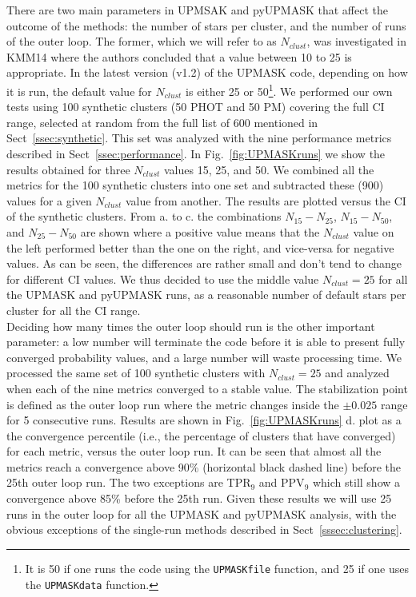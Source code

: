 \documentclass{aa}
\begin{document}
 There are two main parameters in UPMSAK and pyUPMASK that affect the outcome
 of the methods: the number of stars per cluster, and the number of runs of the
 outer loop.
 The former, which we will refer to as $N_{clust}$, was investigated in KMM14
 where the authors concluded that a value between 10 to 25 is appropriate. In
 the latest version (v1.2) of the UPMASK code, depending on how it is run, the
 default value for $N_{clust}$ is either 25 or 50\footnote{It is 50 if one runs
 the code using the \texttt{UPMASKfile} function, and 25 if one uses the
 \texttt{UPMASKdata} function.}.
 We performed our own tests using 100 synthetic clusters (50 PHOT and 50 PM)
 covering the full CI range, selected at random from the full list of 600
 mentioned in Sect~\ref{ssec:synthetic}. This set was analyzed with the nine
 performance metrics described in Sect~\ref{ssec:performance}.
 In Fig.~\ref{fig:UPMASKruns} we show the results obtained for three
 $N_{clust}$ values 15, 25, and 50. We combined all the metrics for the 100
 synthetic clusters into one set and subtracted these (900) values for a
 given $N_{clust}$ value from another. The results are plotted versus the CI of
 the synthetic clusters. From a. to c. the combinations
 $N_{15}-N_{25}$, $N_{15}-N_{50}$, and $N_{25}-N_{50}$ are shown where a
 positive value means that the $N_{clust}$ value on the left performed better
 than the one on the right, and vice-versa for negative values. As can be seen,
 the differences are rather small and don't tend to change for different CI
 values.
 We thus decided to use the middle value $N_{clust}=25$ for all the UPMASK and
 pyUPMASK runs, as a reasonable number of default stars per cluster for all the
 CI range.\\

 Deciding how many times the outer loop should run is the other important
 parameter: a low number will terminate the code before it is able to present
 fully converged probability values, and a large number will waste processing
 time. We processed the same set of 100 synthetic clusters with $N_{clust}=25$
 and analyzed when each of the nine metrics converged to a stable value. The
 stabilization point is defined as the outer loop run where the metric changes
 inside the $\pm0.025$ range for 5 consecutive runs. Results are shown in
 Fig.~\ref{fig:UPMASKruns} d. plot as a the convergence percentile 
 (i.e., the percentage of clusters that have converged) for each metric, versus
 the outer loop run. It can be seen that almost all the metrics reach a
 convergence above 90\% (horizontal black dashed line) before the 25th outer
 loop run. The two exceptions are TPR$_9$ and PPV$_9$ which still show a
 convergence above 85\% before the 25th run.
 Given these results we will use 25 runs in the outer loop for all the UPMASK
 and pyUPMASK analysis, with the obvious exceptions of the single-run methods
 described in Sect~\ref{sssec:clustering}.
\end{document}
